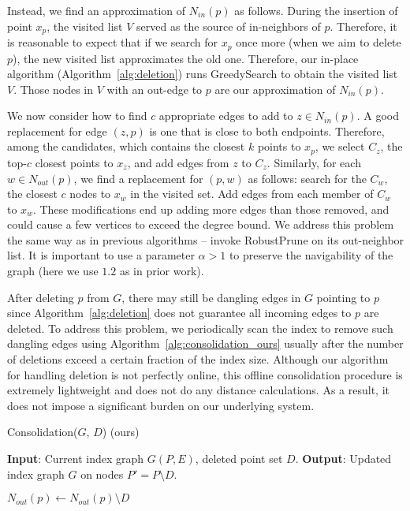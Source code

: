 Instead, we find an approximation of $N_{in}(p)$ as follows.
During the insertion of point $x_p$, the visited list $V$ served as the source of in-neighbors of $p$.
Therefore, it is reasonable to expect that if we search for $x_p$ once more (when we aim to delete $p$),
the new visited list approximates the old one. 
Therefore, our in-place algorithm (Algorithm~\ref{alg:deletion}) runs \textsf{GreedySearch} to
obtain the visited list $V$. Those nodes in $V$ with an out-edge to $p$ are our approximation of $N_{in}(p)$.

We now consider how to find $c$ appropriate edges to add to $z\in N_{in}(p)$.
A good replacement for edge $(z,p)$ is one that is close to both endpoints. 
Therefore, among the \textsf{candidates}, which contains the closest $k$ points to $x_p$,
we select $C_z$, the top-$c$ closest points to $x_z$, and add edges from $z$ to $C_z$.
Similarly, for each $w \in N_{out}(p)$, we find a replacement for $(p,w)$ as follows:
search for the $C_w$, the closest $c$ nodes to $x_w$ in the visited set. 
Add edges from each member of $C_w$ to $x_w$.
These modifications end up adding more edges than those removed, and could
cause a few vertices to exceed the degree bound. We address this problem the same
way as in previous algorithms -- invoke \textsf{RobustPrune} on its out-neighbor list.
It is important to use a parameter $\alpha>1$ to preserve the navigability of the graph
(here we use $1.2$ as in prior work).

After deleting $p$ from $G$, there may still be dangling edges in $G$ pointing to $p$
since Algorithm~\ref{alg:deletion} does not guarantee all incoming edges to $p$ are deleted.
To address this problem, we periodically scan the index to remove such dangling edges using Algorithm~\ref{alg:consolidation_ours}
usually after the number of deletions exceed a certain fraction of the index size.
Although our algorithm for handling deletion is not perfectly online, this offline
consolidation procedure is extremely lightweight and does not do any distance calculations.
As a result,  it does not impose a significant burden on our underlying system.


\begin{algorithm}
\caption{Consolidation($G$, $D$) (ours)}
\label{alg:consolidation_ours}
\begin{algorithmic}[1]
\State \textbf{Input}: Current index graph $G(P,E)$, deleted point set $D$.
\State \textbf{Output}: Updated index graph $G$ on nodes $P'=P\setminus D$.

    \State $N_{out}(p)\gets N_{out}(p)\setminus D$ 
\EndFor

\end{algorithmic}
\end{algorithm}

